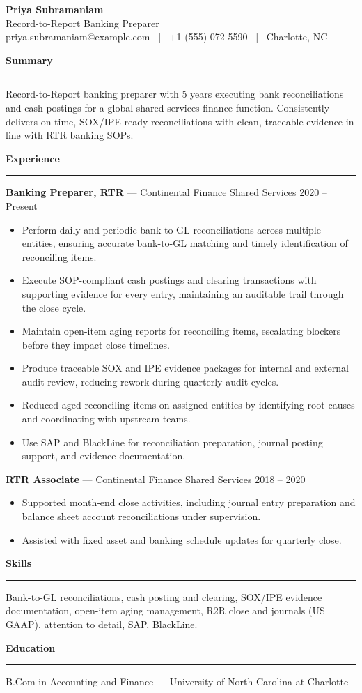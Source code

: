 \documentclass[11pt]{article}
\newcommand{\rsection}[1]{%
  \vspace{10pt}
  {\large\bfseries #1}\\[-4pt]
  \rule{\linewidth}{0.6pt}\vspace{4pt}
}
\begin{document}
\begin{center}
  {\Huge\bfseries Priya Subramaniam}\\[4pt]
  Record-to-Report Banking Preparer \\
  priya.subramaniam@example.com \ $\vert$ \ +1 (555) 072-5590 \ $\vert$ \ Charlotte, NC
\end{center}

\rsection{Summary}
Record-to-Report banking preparer with 5 years executing bank reconciliations and cash postings for a global shared services finance function. Consistently delivers on-time, SOX/IPE-ready reconciliations with clean, traceable evidence in line with RTR banking SOPs.

\rsection{Experience}
\textbf{Banking Preparer, RTR} --- Continental Finance Shared Services \hfill 2020 -- Present
\begin{itemize}
  \item Perform daily and periodic bank-to-GL reconciliations across multiple entities, ensuring accurate bank-to-GL matching and timely identification of reconciling items.
  \item Execute SOP-compliant cash postings and clearing transactions with supporting evidence for every entry, maintaining an auditable trail through the close cycle.
  \item Maintain open-item aging reports for reconciling items, escalating blockers before they impact close timelines.
  \item Produce traceable SOX and IPE evidence packages for internal and external audit review, reducing rework during quarterly audit cycles.
  \item Reduced aged reconciling items on assigned entities by identifying root causes and coordinating with upstream teams.
  \item Use SAP and BlackLine for reconciliation preparation, journal posting support, and evidence documentation.
\end{itemize}

\textbf{RTR Associate} --- Continental Finance Shared Services \hfill 2018 -- 2020
\begin{itemize}
  \item Supported month-end close activities, including journal entry preparation and balance sheet account reconciliations under supervision.
  \item Assisted with fixed asset and banking schedule updates for quarterly close.
\end{itemize}

\rsection{Skills}
Bank-to-GL reconciliations, cash posting and clearing, SOX/IPE evidence documentation, open-item aging management, R2R close and journals (US GAAP), attention to detail, SAP, BlackLine.

\rsection{Education}
B.Com in Accounting and Finance --- University of North Carolina at Charlotte
\end{document}
